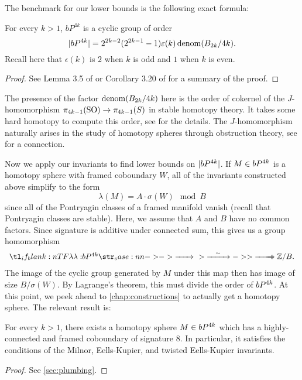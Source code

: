 The benchmark for our lower bounds is the following exact formula:
\begin{theorem}\label{thm:kervaire-milnor}
	For every $k>1$, $bP^{4k}$ is a cyclic group of order
	\[
		|bP^{4k}| =2^{2k-2}(2^{2k-1}-1)\varepsilon(k)\operatorname{denom}(B_{2k}/4k).
	\]
	Recall here that $\epsilon(k)$ is $2$ when $k$ is odd and $1$ when $k$ is even.
\end{theorem}
\begin{proof}
	See Lemma 3.5 of \cite{milnor1958manifolds} or Corollary 3.20 of \cite{levine1985lectures} for a summary of the proof.
\end{proof}

\begin{remark*}
	The presence of the factor $\operatorname{denom}(B_{2k}/4k)$ here is the order of cokernel of the $J$-homomorphism $\pi_{4k-1}(\mathrm{SO}) \to \pi_{4k-1}(S)$ in stable homotopy theory. It takes some hard homotopy to compute this order, see \cite{adams1966J} for the details. The $J$-homomorphism naturally arises in the study of homotopy spheres through obstruction theory, see \cite{milnorkervaire1960bernoulli} for a connection.
\end{remark*}

Now we apply our invariants to find lower bounds on $|bP^{4k}|$. If $M\in bP^{4k}$ is a homotopy sphere with framed coboundary $W$, all of the invariants constructed above simplify to the form
\[
		\lambda(M) = A\cdot \sigma(W) \mod B
\]
since all of the Pontryagin classes of a framed manifold vanish (recall that Pontryagin classes are stable). Here, we assume that $A$ and $B$ have no common factors. Since signature is additive under connected sum, this gives us a group homomorphism
\[
	\lkxfunc{\lambda}{\bP^{4k}}{\Z/B.}
\]
The image of the cyclic group generated by $M$ under this map then has image of size $B/\sigma(W)$. By Lagrange's theorem, this must divide the order of $bP^{4k}$. At this point, we peek ahead to \cref{chap:constructions} to actually get a homotopy sphere. The relevant result is:

\begin{proposition}
	For every $k>1$, there exists a homotopy sphere $M\in bP^{4k}$ which has a highly-connected and framed coboundary of signature 8. In particular, it satisfies the conditions of the Milnor, Eells-Kupier, and twisted Eells-Kupier invariants.
\end{proposition}
\begin{proof}
	See \cref{sec:plumbing}.
\end{proof}

